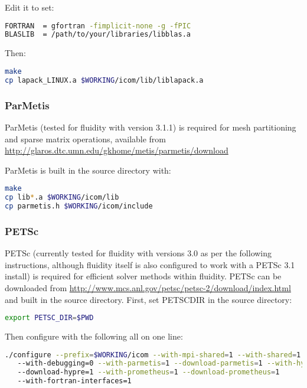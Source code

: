 Edit it to set:

\begin{lstlisting}[language=bash]
FORTRAN  = gfortran -fimplicit-none -g -fPIC
BLASLIB  = /path/to/your/libraries/libblas.a
\end{lstlisting}

Then:

\begin{lstlisting}[language=bash]
make
cp lapack_LINUX.a $WORKING/icom/lib/liblapack.a
\end{lstlisting}

\subsubsection{ParMetis}
\label{sect:required_libraries_numerical_parmetis}

ParMetis (tested for fluidity with version 3.1.1) is required for mesh
partitioning and sparse matrix operations, available from
\url{http://glaros.dtc.umn.edu/gkhome/metis/parmetis/download}

ParMetis is built in the source directory with:

\begin{lstlisting}[language=bash]
make
cp lib*.a $WORKING/icom/lib
cp parmetis.h $WORKING/icom/include
\end{lstlisting}

\subsubsection{PETSc}
\label{sect:required_libraries_numerical_petsc}

PETSc (currently tested for fluidity with versions 3.0 as per the following
instructions, although fluidity itself is also configured to work with a PETSc
3.1 install) is required for efficient solver methods within fluidity. PETSc
can be downloaded from
\url{http://www.mcs.anl.gov/petsc/petsc-2/download/index.html} and built in the
source directory. First, set PETSC{\textunderscore}DIR in the source directory:

\begin{lstlisting}[language=bash]
export PETSC_DIR=$PWD
\end{lstlisting}

Then configure with the following all on one line:

\begin{lstlisting}[language=bash]
./configure --prefix=$WORKING/icom --with-mpi-shared=1 --with-shared=1
   --with-debugging=0 --with-parmetis=1 --download-parmetis=1 --with-hypre=1
   --download-hypre=1 --with-prometheus=1 --download-prometheus=1
   --with-fortran-interfaces=1
\end{lstlisting}

